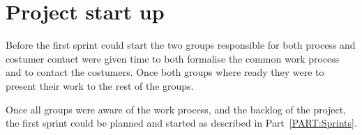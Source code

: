 \section{Project start up}
Before the first sprint could start the two groups responsible for both process and costumer contact were given time to both formalise the common work process and to contact the costumers.
Once both groups where ready they were to present their work to the rest of the groups.

Once all groups were aware of the work process, and the backlog of the project, the first sprint could be planned and started as described in Part~\ref{PART:Sprints}.
